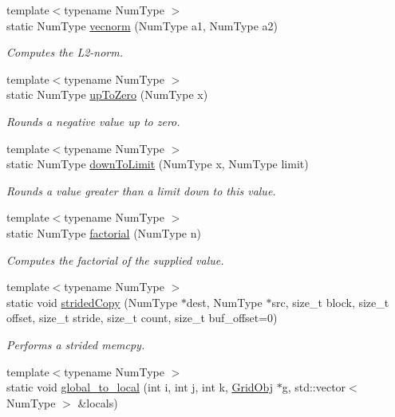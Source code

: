 \begin{DoxyCompactItemize}
{\footnotesize template$<$typename Num\+Type $>$ }\\static Num\+Type \hyperlink{class_grid_utils_a7a169fc043a585f20936b314def45fe7}{vecnorm} (Num\+Type a1, Num\+Type a2)
\begin{DoxyCompactList}\small\item\em Computes the L2-\/norm. \end{DoxyCompactList}\item 
{\footnotesize template$<$typename Num\+Type $>$ }\\static Num\+Type \hyperlink{class_grid_utils_a5a3e26a94e62833f0a9e5a4bda066dac}{up\+To\+Zero} (Num\+Type x)
\begin{DoxyCompactList}\small\item\em Rounds a negative value up to zero. \end{DoxyCompactList}\item 
{\footnotesize template$<$typename Num\+Type $>$ }\\static Num\+Type \hyperlink{class_grid_utils_abd4068e22339d5272ca551f8cbddec26}{down\+To\+Limit} (Num\+Type x, Num\+Type limit)
\begin{DoxyCompactList}\small\item\em Rounds a value greater than a limit down to this value. \end{DoxyCompactList}\item 
{\footnotesize template$<$typename Num\+Type $>$ }\\static Num\+Type \hyperlink{class_grid_utils_a57edeaeba2d67d187a9edd0b560fe0c2}{factorial} (Num\+Type n)
\begin{DoxyCompactList}\small\item\em Computes the factorial of the supplied value. \end{DoxyCompactList}\item 
{\footnotesize template$<$typename Num\+Type $>$ }\\static void \hyperlink{class_grid_utils_aa3ca6e20ef4fa927cb845956d7565b1e}{strided\+Copy} (Num\+Type $\ast$dest, Num\+Type $\ast$src, size\+\_\+t block, size\+\_\+t offset, size\+\_\+t stride, size\+\_\+t count, size\+\_\+t buf\+\_\+offset=0)
\begin{DoxyCompactList}\small\item\em Performs a strided memcpy. \end{DoxyCompactList}\item 
{\footnotesize template$<$typename Num\+Type $>$ }\\static void \hyperlink{class_grid_utils_a28cba8aa8cbe5dd20fa3405e2f46eeb2}{global\+\_\+to\+\_\+local} (int i, int j, int k, \hyperlink{class_grid_obj}{Grid\+Obj} $\ast$g, std\+::vector$<$ Num\+Type $>$ \&locals)

\end{DoxyCompactItemize}
